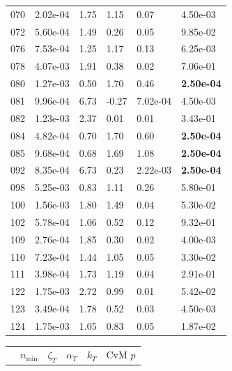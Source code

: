 \begin{figure}[htbp!]
{\begin{minipage}[t]{0.48\linewidth}
\begin{tabular}{llllll}
                    070 & 2.02e-04 & 1.75 & 1.15 & 0.07 & 4.50e-03\\
                    072 & 5.60e-04 & 1.49 & 0.26 & 0.05 & 9.85e-02\\
                    076 & 7.53e-04 & 1.25 & 1.17 & 0.13 & 6.25e-03\\
                    078 & 4.07e-03 & 1.91 & 0.38 & 0.02 & 7.06e-01\\
                    080 & 1.27e-03 & 0.50 & 1.70 & 0.46 & \textbf{2.50e-04}\\
                    081 & 9.96e-04 & 6.73 & -0.27 & 7.02e-04 & 4.50e-03\\
                    082 & 1.23e-03 & 2.37 & 0.01 & 0.01 & 3.43e-01\\
                    084 & 4.82e-04 & 0.70 & 1.70 & 0.60 & \textbf{2.50e-04}\\
                    085 & 9.68e-04 & 0.68 & 1.69 & 1.08 & \textbf{2.50e-04}\\
                    092 & 8.35e-04 & 6.73 & 0.23 & 2.22e-03 & \textbf{2.50e-04}\\
                    098 & 5.25e-03 & 0.83 & 1.11 & 0.26 & 5.80e-01\\
                    100 & 1.56e-03 & 1.80 & 1.49 & 0.04 & 5.30e-02\\
                    102 & 5.78e-04 & 1.06 & 0.52 & 0.12 & 9.32e-01\\
                    109 & 2.76e-04 & 1.85 & 0.30 & 0.02 & 4.00e-03\\
                    110 & 7.23e-04 & 1.44 & 1.05 & 0.05 & 3.30e-02\\
                    111 & 3.98e-04 & 1.73 & 1.19 & 0.04 & 2.91e-01\\
                    122 & 1.75e-03 & 2.72 & 0.99 & 0.01 & 5.42e-02\\
                    123 & 3.49e-04 & 1.78 & 0.52 & 0.03 & 4.50e-03\\
                    124 & 1.75e-03 & 1.05 & 0.83 & 0.05 & 1.87e-02\\
        \bottomrule
        \end{tabular}
    \end{minipage}
    \hspace{0.02\linewidth}
    \begin{minipage}[t]{0.48\linewidth}
        \centering
        \begin{tabular}{llllll}
        \toprule
         & $n_{\min}$ & $\zeta_T$ & $\alpha_T$ & $k_T$ & CvM $p$ \\

\end{tabular}
\end{minipage}}
\end{figure}

